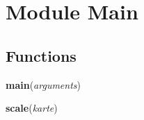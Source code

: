 %
%
%


\section{Module Main}

    \label{Main}


  \subsection{Functions}

    \label{Main:main}

    \vspace{0.5ex}

\hspace{.8\funcindent}\begin{boxedminipage}{\funcwidth}

    \raggedright \textbf{main}(\textit{arguments})

\setlength{\parskip}{2ex}
\setlength{\parskip}{1ex}
    \end{boxedminipage}

    \label{Main:scale}

    \vspace{0.5ex}

\hspace{.8\funcindent}\begin{boxedminipage}{\funcwidth}

    \raggedright \textbf{scale}(\textit{karte})

\setlength{\parskip}{2ex}
\setlength{\parskip}{1ex}
    \end{boxedminipage}

    \label{Main:berechneMinimum}

